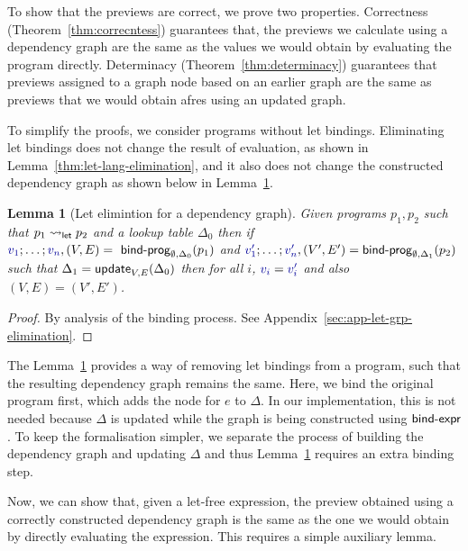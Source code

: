 \documentclass[english,submission]{programming}
\newcounter{thc}
\theoremstyle{plain}
\newtheorem{lem}[thc]{Lemma}
\theoremstyle{definition}
\newcommand{\ident}[1]{\textnormal{\textcolor{idclr}{\sffamily #1}}}
\newcommand{\bndclr}[1]{\textcolor{kvdclr}{#1}}
\begin{document}
To show that the previews are correct, we prove two properties. Correctness (Theorem~\ref{thm:correcntess})
guarantees that, the previews we calculate using a dependency graph are the same as the values we
would obtain by evaluating the program directly. Determinacy (Theorem~\ref{thm:determinacy})
guarantees that previews assigned to a graph node based on an earlier graph are the same as
previews that we would obtain afres using an updated graph.

To simplify the proofs, we consider programs without let bindings. Eliminating let bindings does
not change the result of evaluation, as shown in Lemma~\ref{thm:let-lang-elimination}, and it also
does not change the constructed dependency graph as shown below in Lemma~\ref{thm:let-grp-elimination}.

\begin{lem}[Let elimintion for a dependency graph]
\label{thm:let-grp-elimination}
Given programs $p_1, p_2$ such that $p_1 \rightsquigarrow_\ident{let} p_2$ and a lookup table
$\Delta_0$ then if $\bndclr{v_1}; \ldots; \bndclr{v_n}, (V, E) = \ident{bind-prog}_{\emptyset, \Delta_0}(p_1)$ and
$\bndclr{v'_1};\ldots;\bndclr{v'_n}, (V', E') = \ident{bind-prog}_{\emptyset, \Delta_1}(p_2)$ such that $\Delta_1 = \ident{update}_{V, E}(\Delta_0)$
then for all $i$, $\bndclr{v_i} = \bndclr{v'_i}$ and also $(V, E) = (V', E')$.
\end{lem}
\begin{proof}
By analysis of the binding process. See Appendix~\ref{sec:app-let-grp-elimination}.
\end{proof}

\noindent
The Lemma~\ref{thm:let-grp-elimination} provides a way of removing let bindings from a program,
such that the resulting dependency graph remains the same. Here, we bind the original program
first, which adds the node for $e$ to $\Delta$. In our implementation, this is not needed
because $\Delta$ is updated while the graph is being constructed using $\ident{bind-expr}$.
To keep the formalisation simpler, we separate the process of building the dependency graph
and updating $\Delta$ and thus Lemma~\ref{thm:let-grp-elimination} requires an extra binding step.

Now, we can show that, given a let-free expression, the preview obtained using a correctly
constructed dependency graph is the same as the one we would obtain by directly evaluating the
expression. This requires a simple auxiliary lemma.
\end{document}
